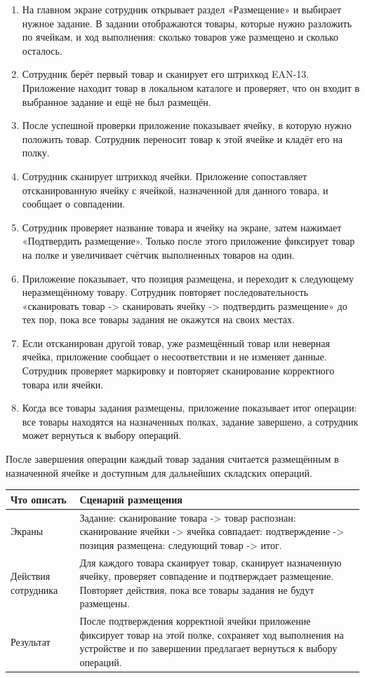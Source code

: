 \begin{enumerate}
    \item На главном экране сотрудник открывает раздел «Размещение» и выбирает нужное задание. В задании отображаются товары, которые нужно разложить по ячейкам, и ход выполнения: сколько товаров уже размещено и сколько осталось.
    \item Сотрудник берёт первый товар и сканирует его штрихкод EAN-13. Приложение находит товар в локальном каталоге и проверяет, что он входит в выбранное задание и ещё не был размещён.
    \item После успешной проверки приложение показывает ячейку, в которую нужно положить товар. Сотрудник переносит товар к этой ячейке и кладёт его на полку.
    \item Сотрудник сканирует штрихкод ячейки. Приложение сопоставляет отсканированную ячейку с ячейкой, назначенной для данного товара, и сообщает о совпадении.
    \item Сотрудник проверяет название товара и ячейку на экране, затем нажимает «Подтвердить размещение». Только после этого приложение фиксирует товар на полке и увеличивает счётчик выполненных товаров на один.
    \item Приложение показывает, что позиция размещена, и переходит к следующему неразмещённому товару. Сотрудник повторяет последовательность «сканировать товар -> сканировать ячейку -> подтвердить размещение» до тех пор, пока все товары задания не окажутся на своих местах.
    \item Если отсканирован другой товар, уже размещённый товар или неверная ячейка, приложение сообщает о несоответствии и не изменяет данные. Сотрудник проверяет маркировку и повторяет сканирование корректного товара или ячейки.
    \item Когда все товары задания размещены, приложение показывает итог операции: все товары находятся на назначенных полках, задание завершено, а сотрудник может вернуться к выбору операций.
\end{enumerate}

После завершения операции каждый товар задания считается размещённым в назначенной ячейке и доступным для дальнейших складских операций.

\begin{tabularx}{\textwidth}{L{42mm}Y}
\toprule
\textbf{Что описать} & \textbf{Сценарий размещения} \\
\midrule
Экраны & Задание: сканирование товара -> товар распознан: сканирование ячейки -> ячейка совпадает: подтверждение -> позиция размещена: следующий товар -> итог. \\
Действия сотрудника & Для каждого товара сканирует товар, сканирует назначенную ячейку, проверяет совпадение и подтверждает размещение. Повторяет действия, пока все товары задания не будут размещены. \\
Результат & После подтверждения корректной ячейки приложение фиксирует товар на этой полке, сохраняет ход выполнения на устройстве и по завершении предлагает вернуться к выбору операций. \\
\bottomrule
\end{tabularx}

